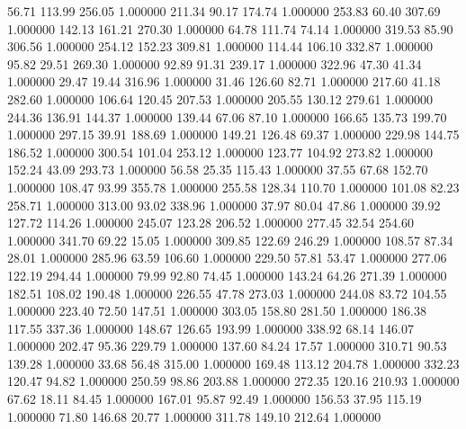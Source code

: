      56.71    113.99    256.05  1.000000
    211.34     90.17    174.74  1.000000
    253.83     60.40    307.69  1.000000
    142.13    161.21    270.30  1.000000
     64.78    111.74     74.14  1.000000
    319.53     85.90    306.56  1.000000
    254.12    152.23    309.81  1.000000
    114.44    106.10    332.87  1.000000
     95.82     29.51    269.30  1.000000
     92.89     91.31    239.17  1.000000
    322.96     47.30     41.34  1.000000
     29.47     19.44    316.96  1.000000
     31.46    126.60     82.71  1.000000
    217.60     41.18    282.60  1.000000
    106.64    120.45    207.53  1.000000
    205.55    130.12    279.61  1.000000
    244.36    136.91    144.37  1.000000
    139.44     67.06     87.10  1.000000
    166.65    135.73    199.70  1.000000
    297.15     39.91    188.69  1.000000
    149.21    126.48     69.37  1.000000
    229.98    144.75    186.52  1.000000
    300.54    101.04    253.12  1.000000
    123.77    104.92    273.82  1.000000
    152.24     43.09    293.73  1.000000
     56.58     25.35    115.43  1.000000
     37.55     67.68    152.70  1.000000
    108.47     93.99    355.78  1.000000
    255.58    128.34    110.70  1.000000
    101.08     82.23    258.71  1.000000
    313.00     93.02    338.96  1.000000
     37.97     80.04     47.86  1.000000
     39.92    127.72    114.26  1.000000
    245.07    123.28    206.52  1.000000
    277.45     32.54    254.60  1.000000
    341.70     69.22     15.05  1.000000
    309.85    122.69    246.29  1.000000
    108.57     87.34     28.01  1.000000
    285.96     63.59    106.60  1.000000
    229.50     57.81     53.47  1.000000
    277.06    122.19    294.44  1.000000
     79.99     92.80     74.45  1.000000
    143.24     64.26    271.39  1.000000
    182.51    108.02    190.48  1.000000
    226.55     47.78    273.03  1.000000
    244.08     83.72    104.55  1.000000
    223.40     72.50    147.51  1.000000
    303.05    158.80    281.50  1.000000
    186.38    117.55    337.36  1.000000
    148.67    126.65    193.99  1.000000
    338.92     68.14    146.07  1.000000
    202.47     95.36    229.79  1.000000
    137.60     84.24     17.57  1.000000
    310.71     90.53    139.28  1.000000
     33.68     56.48    315.00  1.000000
    169.48    113.12    204.78  1.000000
    332.23    120.47     94.82  1.000000
    250.59     98.86    203.88  1.000000
    272.35    120.16    210.93  1.000000
     67.62     18.11     84.45  1.000000
    167.01     95.87     92.49  1.000000
    156.53     37.95    115.19  1.000000
     71.80    146.68     20.77  1.000000
    311.78    149.10    212.64  1.000000
